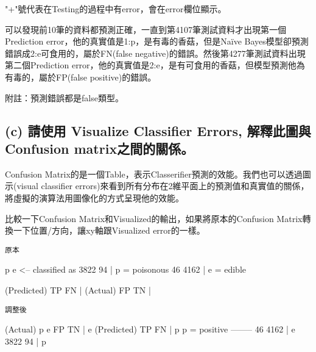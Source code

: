\documentclass[11pt]{article}
\newenvironment{Shaded}{}{}
\newcommand{\DecValTok}[1]{\textcolor[rgb]{0.25,0.63,0.44}{{#1}}}
\newcommand{\NormalTok}[1]{{#1}}
\newcommand{\ImportTok}[1]{{#1}}
\newcommand{\OperatorTok}[1]{\textcolor[rgb]{0.40,0.40,0.40}{{#1}}}
\newcommand{\AttributeTok}[1]{\textcolor[rgb]{0.49,0.56,0.16}{{#1}}}
\begin{document}
"+"號代表在Testing的過程中有error，會在error欄位顯示。

可以發現前10筆的資料都預測正確，一直到第4107筆測試資料才出現第一個Prediction
error，他的真實值是1:p，是有毒的香菇，但是Naïve
Bayes模型卻預測錯誤成2:e可食用的，屬於FN(false
negative)的錯誤。然後第4277筆測試資料出現第二個Prediction
error，他的真實值是2:e，是有可食用的香菇，但模型預測他為有毒的，屬於FP(false
positive)的錯誤。

附註：預測錯誤都是false類型。

    \subsection{(c) 請使用 Visualize Classifier Errors, 解釋此圖與 Confusion
matrix之間的關係。}\label{c-ux8acbux4f7fux7528-visualize-classifier-errors-ux89e3ux91cbux6b64ux5716ux8207-confusion-matrixux4e4bux9593ux7684ux95dcux4fc2}

Confusion
Matrix的是一個Table，表示Classerifier預測的效能。我們也可以透過圖示(visual
classifier
errors)來看到所有分布在2維平面上的預測值和真實值的關係，將虛擬的演算法用圖像化的方式呈現他的效能。

比較一下Confusion Matrix和Visualized的輸出，如果將原本的Confusion
Matrix轉換一下位置/方向，讓xy軸跟Visualized error的一樣。

\texttt{原本}

\begin{Shaded}
\begin{Highlighting}[]
\NormalTok{    p    e   }\OperatorTok{<--}\NormalTok{ classified }\ImportTok{as}
 \DecValTok{3822}   \DecValTok{94} \OperatorTok{|}\NormalTok{    p }\OperatorTok{=}\NormalTok{ poisonous}
   \DecValTok{46} \DecValTok{4162} \OperatorTok{|}\NormalTok{    e }\OperatorTok{=}\NormalTok{ edible}
   
\NormalTok{ (Predicted)}
\NormalTok{   TP   FN }\OperatorTok{|}\NormalTok{ (Actual) }
\NormalTok{   FP   TN }\OperatorTok{|}
\end{Highlighting}
\end{Shaded}

\texttt{調整後}

\begin{Shaded}
\begin{Highlighting}[]
\NormalTok{  (Actual)  }
\NormalTok{    p    e}
\NormalTok{   FP   TN }\OperatorTok{|} \AttributeTok{e}\NormalTok{ (Predicted) }
\NormalTok{   TP   FN }\OperatorTok{|}\NormalTok{ p  p }\OperatorTok{=}\NormalTok{ positive}
   \OperatorTok{--------}
   \DecValTok{46} \DecValTok{4162} \OperatorTok{|}\NormalTok{ e}
 \DecValTok{3822}   \DecValTok{94} \OperatorTok{|}\NormalTok{ p}
\end{Highlighting}
\end{Shaded}
\end{document}
